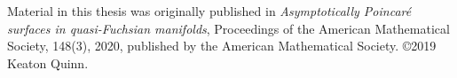 \appendix



\chapter{}

Material in this thesis was originally published in \emph{Asymptotically Poincaré surfaces in quasi-Fuchsian manifolds}, Proceedings of the American Mathematical Society, 148(3), 2020, published by the American Mathematical Society. \copyright 2019 Keaton Quinn.

\thispagestyle{pageonbottom}